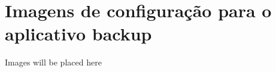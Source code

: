 \chapter{Imagens de configuração para o aplicativo backup}
\label{attachmentsImagensBackup}

Images will be placed here



